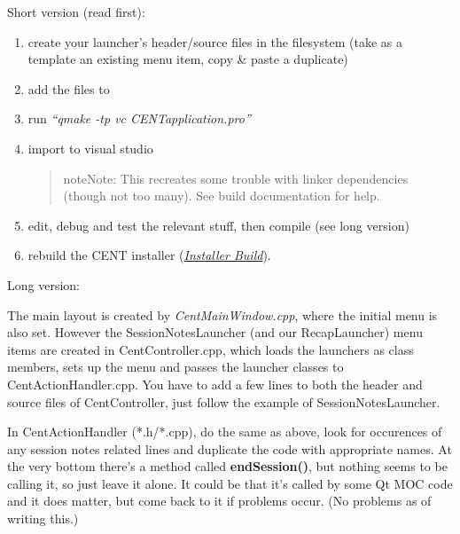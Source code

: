 \documentclass[letterpaper,10pt,english]{sphinxmanual}
\begin{document}
Short version (read first):
\begin{enumerate}
\item {} 
create your launcher's header/source files in the filesystem (take as a template an existing menu item, copy \& paste a duplicate)

\item {} 
add the files to 

\item {} 
run \emph{``qmake -tp vc CENTapplication.pro''}

\item {} 
import to visual studio
\begin{quote}

\begin{notice}{note}{Note:}
This recreates some trouble with linker dependencies (though not too many). See build documentation for help.
\end{notice}
\end{quote}

\item {} 
edit, debug and test the relevant stuff, then compile (see long version)

\item {} 
rebuild the CENT installer ({\hyperref[index:installer-build]{\emph{Installer Build}}}).

\end{enumerate}

Long version:

The main layout is created by \emph{CentMainWindow.cpp}, where the initial menu is also set. However the SessionNotesLauncher (and our RecapLauncher) menu items are created in CentController.cpp, which loads the launchers as class members, sets up the menu and passes the launcher classes to CentActionHandler.cpp. You have to add a few lines to both the header and source files of CentController, just follow the example of SessionNotesLauncher.

In CentActionHandler (*.h/*.cpp), do the same as above, look for occurences of any session notes related lines and duplicate the code with appropriate names. At the very bottom there's a method called \textbf{endSession()}, but nothing seems to be calling it, so just leave it alone. It could be that it's called by some Qt MOC code and it does matter, but come back to it if problems occur. (No problems as of writing this.)
\end{document}
